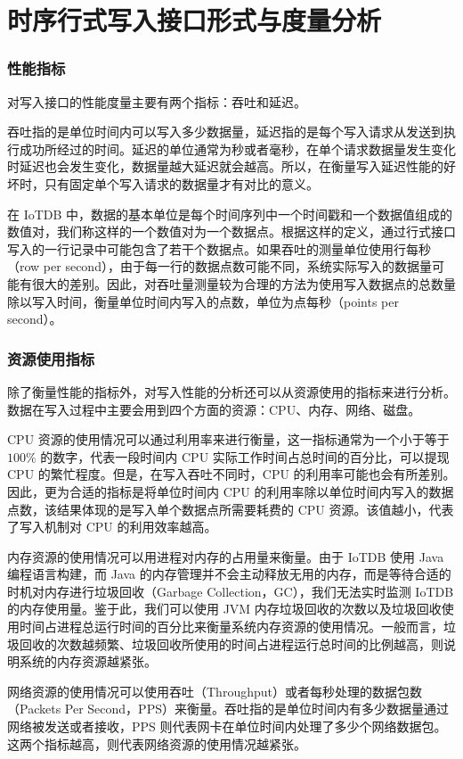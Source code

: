 \section{时序行式写入接口形式与度量分析\label{sec:chap1-sec2}}
\subsubsection{性能指标}
对写入接口的性能度量主要有两个指标：吞吐和延迟。

吞吐指的是单位时间内可以写入多少数据量，延迟指的是每个写入请求从发送到执行成功所经过的时间。延迟的单位通常为秒或者毫秒，在单个请求数据量发生变化时延迟也会发生变化，数据量越大延迟就会越高。所以，在衡量写入延迟性能的好坏时，只有固定单个写入请求的数据量才有对比的意义。

在 IoTDB 中，数据的基本单位是每个时间序列中一个时间戳和一个数据值组成的数值对，我们称这样的一个数值对为一个数据点。根据这样的定义，通过行式接口写入的一行记录中可能包含了若干个数据点。如果吞吐的测量单位使用行每秒（row per second），由于每一行的数据点数可能不同，系统实际写入的数据量可能有很大的差别。因此，对吞吐量测量较为合理的方法为使用写入数据点的总数量除以写入时间，衡量单位时间内写入的点数，单位为点每秒（points per second）。

\subsubsection{资源使用指标}
除了衡量性能的指标外，对写入性能的分析还可以从资源使用的指标来进行分析。数据在写入过程中主要会用到四个方面的资源：CPU、内存、网络、磁盘。

CPU 资源的使用情况可以通过利用率来进行衡量，这一指标通常为一个小于等于 $100\%$ 的数字，代表一段时间内 CPU 实际工作时间占总时间的百分比，可以提现 CPU 的繁忙程度。但是，在写入吞吐不同时，CPU 的利用率可能也会有所差别。因此，更为合适的指标是将单位时间内 CPU 的利用率除以单位时间内写入的数据点数，该结果体现的是写入单个数据点所需要耗费的 CPU 资源。该值越小，代表了写入机制对 CPU 的利用效率越高。

内存资源的使用情况可以用进程对内存的占用量来衡量。由于 IoTDB 使用 Java 编程语言构建，而 Java 的内存管理并不会主动释放无用的内存，而是等待合适的时机对内存进行垃圾回收（Garbage Collection，GC）\cite{manson2005java}，我们无法实时监测 IoTDB 的内存使用量。鉴于此，我们可以使用 JVM 内存垃圾回收的次数以及垃圾回收使用时间占进程总运行时间的百分比来衡量系统内存资源的使用情况。一般而言，垃圾回收的次数越频繁、垃圾回收所使用的时间占进程运行总时间的比例越高，则说明系统的内存资源越紧张。

网络资源的使用情况可以使用吞吐（Throughput）或者每秒处理的数据包数（Packets Per Second，PPS）来衡量。吞吐指的是单位时间内有多少数据量通过网络被发送或者接收，PPS 则代表网卡在单位时间内处理了多少个网络数据包。这两个指标越高，则代表网络资源的使用情况越紧张。

